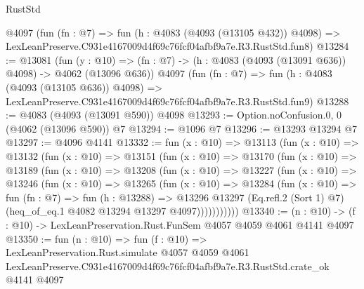 \begin{lexlean}{RustStd}
\begin{coremodule}
    @4097
    (fun (fn : @7) =>
    fun (h : @4083 (@4093 (@13105 @432)) @4098) =>
    LexLeanPreserve.C931e4167009d4f69c76fcf04afbf9a7e.R3.RustStd.fun8)
@13284 := @13081
    (fun (y : @10) => (fn : @7) -> (h : @4083 (@4093 (@13091 @636)) @4098) -> @4062 (@13096 @636))
    @4097
    (fun (fn : @7) =>
    fun (h : @4083 (@4093 (@13105 @636)) @4098) =>
    LexLeanPreserve.C931e4167009d4f69c76fcf04afbf9a7e.R3.RustStd.fun9)
@13288 := @4083 (@4093 (@13091 @590)) @4098
@13293 := Option.noConfusion.{0, 0} (@4062 (@13096 @590)) @7
@13294 := @1096 @7
@13296 := @13293 @13294 @7
@13297 := @4096 @4141
@13332 := fun (x : @10) =>
  @13113
    (fun (x : @10) =>
    @13132
      (fun (x : @10) =>
      @13151
        (fun (x : @10) =>
        @13170
          (fun (x : @10) =>
          @13189
            (fun (x : @10) =>
            @13208
              (fun (x : @10) =>
              @13227
                (fun (x : @10) =>
                @13246
                  (fun (x : @10) =>
                  @13265
                    (fun (x : @10) =>
                    @13284
                      (fun (x : @10) =>
                      fun (fn : @7) =>
                      fun (h : @13288) =>
                      @13296
                        @13297
                        (Eq.refl.{2} (Sort 1) @7)
                        (heq_of_eq.{1} @4082 @13294 @13297 @4097)))))))))))
@13340 := (n : @10) -> (f : @10) -> LexLeanPreservation.Rust.FunSem @4057 @4059 @4061 @4141 @4097
@13350 := fun (n : @10) =>
  fun (f : @10) =>
  LexLeanPreservation.Rust.simulate
    @4057
    @4059
    @4061
    LexLeanPreserve.C931e4167009d4f69c76fcf04afbf9a7e.R3.RustStd.crate_ok
    @4141
    @4097
\end{coremodule}
\end{lexlean}
